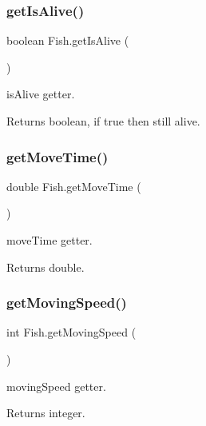 \subsubsection{\texorpdfstring{get\+Is\+Alive()}{getIsAlive()}}
{\footnotesize\ttfamily boolean Fish.\+get\+Is\+Alive (\begin{DoxyParamCaption}{ }\end{DoxyParamCaption})\hspace{0.3cm}{\ttfamily [inline]}}

is\+Alive getter. \begin{DoxyReturn}{Returns}
boolean, if true then still alive. 
\end{DoxyReturn}
\mbox{\label{class_fish_a9e32f70d5f02b4d0fb7e5f0e92e9bf4e}} 
\subsubsection{\texorpdfstring{get\+Move\+Time()}{getMoveTime()}}
{\footnotesize\ttfamily double Fish.\+get\+Move\+Time (\begin{DoxyParamCaption}{ }\end{DoxyParamCaption})\hspace{0.3cm}{\ttfamily [inline]}}

move\+Time getter. \begin{DoxyReturn}{Returns}
double. 
\end{DoxyReturn}
\mbox{\label{class_fish_a256fe3bcc998d4d668e8917e8a453e7a}} 
\subsubsection{\texorpdfstring{get\+Moving\+Speed()}{getMovingSpeed()}}
{\footnotesize\ttfamily int Fish.\+get\+Moving\+Speed (\begin{DoxyParamCaption}{ }\end{DoxyParamCaption})\hspace{0.3cm}{\ttfamily [inline]}}

moving\+Speed getter. \begin{DoxyReturn}{Returns}
integer. 
\end{DoxyReturn}
\mbox{\label{class_fish_a5abbd7e198b7770b666a85c5b02f6501}} 
